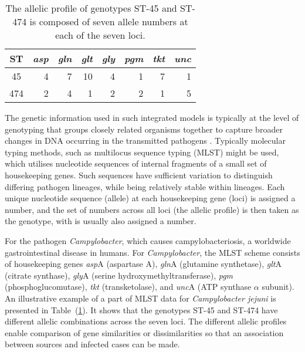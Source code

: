 \documentclass[times, doublespace]{WileyNJD-v2}%
\begin{document}
\begin{table}
  \begin{center}
    \begin{tabular}{crrrrrrr}
      \toprule
      ST & \textit{asp} & \textit{gln} & \textit{glt} & \textit{gly} & \textit{pgm}& \textit{tkt}& \textit{unc}\\ \midrule
      45  & 4 & 7 & 10 & 4 & 1 & 7 & 1\\
      474 & 2 & 4 & 1 & 2 & 2 & 1 & 5 \\
      \bottomrule
    \end{tabular}
  \end{center}
  \caption{The allelic profile of genotypes ST-45 and ST-474 is composed of seven allele numbers at each of the seven loci.}
  \label{tab0}
\end{table}

The genetic information used in such integrated models is typically at the level of genotyping that groups closely related organisms together to capture broader changes in DNA occurring in the transmitted pathogens \cite{Cotta}. Typically molecular typing methods, such as multilocus sequence typing (MLST) \cite{Dingl, Coll} might be used, which utilises nucleotide sequences of internal fragments of a small set of housekeeping genes. Such sequences have sufficient variation to distinguish differing pathogen lineages, while being relatively stable within lineages. Each unique nucleotide sequence (allele) at each housekeeping gene (loci) is assigned a number, and the set of numbers across all loci (the allelic profile) is then taken as the genotype, with is usually also assigned a number.

For the pathogen \textit{Campylobacter}, which causes campylobacteriosis, a worldwide gastrointestinal disease in humans. For \textit{Campylobacter}, the MLST scheme consists of housekeeping genes \textit{asp}A (aspartase A), \textit{gln}A (glutamine synthetase), \textit{glt}A (citrate synthase), \textit{gly}A (serine hydroxymethyltransferase), \textit{pgm} (phosphoglucomutase), \textit{tkt} (transketolase), and \textit{unc}A (ATP synthase $\alpha$ subunit). An illustrative example of a part of MLST data for \emph{Campylobacter jejuni} is presented in Table~(\ref{tab0}). It shows that the genotypes ST-45 and ST-474 have different allelic combinations across the seven loci. The different allelic profiles enable comparison of gene similarities or dissimilarities so that an association between sources and infected cases can be made.
\end{document}
